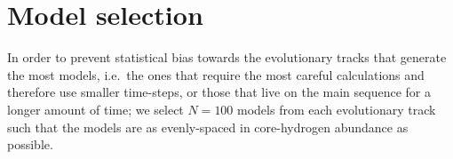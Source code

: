 \documentclass[manuscript]{aastex}
\begin{document}



\section{Model selection}
\label{sec:selection}
In order to prevent statistical bias towards the evolutionary tracks that generate the most models, i.e.~the ones that require the most careful calculations and therefore use smaller time-steps, or those that live on the main sequence for a longer amount of time; we select $N=100$ models from each evolutionary track such that the models are as evenly-spaced in core-hydrogen abundance as possible. 
\end{document}
